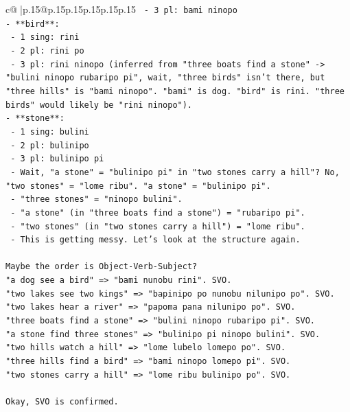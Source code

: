 \documentclass{article}
\begin{document}
{\begin{supertabular}{c@{$\;$}|p{.15\linewidth}@{}p{.15\linewidth}p{.15\linewidth}p{.15\linewidth}p{.15\linewidth}p{.15\linewidth}}
{{{\texttt{  {-} 3 pl: bami ninopo} \\
\texttt{{-} **bird**:} \\
\texttt{  {-} 1 sing: rini} \\
\texttt{  {-} 2 pl: rini po} \\
\texttt{  {-} 3 pl: rini ninopo (inferred from "three boats find a stone" {-}> "bulini ninopo rubaripo pi", wait, "three birds" isn't there, but "three hills" is "bami ninopo". "bami" is dog. "bird" is rini. "three birds" would likely be "rini ninopo").} \\
\texttt{{-} **stone**:} \\
\texttt{  {-} 1 sing: bulini} \\
\texttt{  {-} 2 pl: bulinipo} \\
\texttt{  {-} 3 pl: bulinipo pi} \\
\texttt{  {-} Wait, "a stone" = "bulinipo pi" in "two stones carry a hill"? No, "two stones" = "lome ribu". "a stone" = "bulinipo pi".} \\
\texttt{  {-} "three stones" = "ninopo bulini".} \\
\texttt{  {-} "a stone" (in "three boats find a stone") = "rubaripo pi".} \\
\texttt{  {-} "two stones" (in "two stones carry a hill") = "lome ribu".} \\
\texttt{  {-} This is getting messy. Let's look at the structure again.} \\
\\ 
\texttt{Maybe the order is Object{-}Verb{-}Subject?} \\
\texttt{"a dog see a bird" => "bami nunobu rini". SVO.} \\
\texttt{"two lakes see two kings" => "bapinipo po nunobu nilunipo po". SVO.} \\
\texttt{"two lakes hear a river" => "papoma pana nilunipo po". SVO.} \\
\texttt{"three boats find a stone" => "bulini ninopo rubaripo pi". SVO.} \\
\texttt{"a stone find three stones" => "bulinipo pi ninopo bulini". SVO.} \\
\texttt{"two hills watch a hill" => "lome lubelo lomepo po". SVO.} \\
\texttt{"three hills find a bird" => "bami ninopo lomepo pi". SVO.} \\
\texttt{"two stones carry a hill" => "lome ribu bulinipo po". SVO.} \\
\\ 
\texttt{Okay, SVO is confirmed.} \\
}}}
\end{supertabular}}
\end{document}
